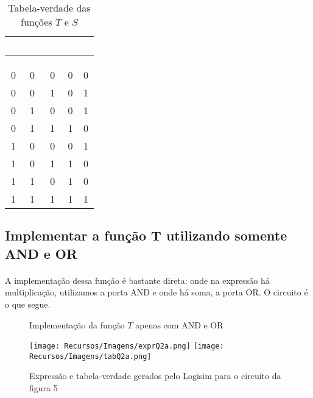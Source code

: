 \documentclass[a4paper, 12pt]{article}
\begin{document}
\begin{table}[H]
    \centering
    \begin{tabular}{|c|c|c|c|c|}
        \hline
        \rowcolor{black}
        \multicolumn{3}{|c|}{\textbf{\textcolor{white}{Entradas}}} & \multicolumn{2}{|c|}{\textbf{\textcolor{white}{Saídas}}} \\ \hline
        \rowcolor{black}
        \textcolor{white}{$A$} & \textcolor{white}{$B$} & \textcolor{white}{$C$} & \textcolor{white}{$T$} & \textcolor{white}{$S$} \\ \hline
        0 & 0 & 0 & 0 & 0 \\ \hline
        \rowcolor{lightgray}
        0 & 0 & 1 & 0 & 1 \\ \hline
        0 & 1 & 0 & 0 & 1 \\ \hline
        \rowcolor{lightgray}
        0 & 1 & 1 & 1 & 0 \\ \hline
        1 & 0 & 0 & 0 & 1 \\ \hline
        \rowcolor{lightgray}
        1 & 0 & 1 & 1 & 0 \\ \hline
        1 & 1 & 0 & 1 & 0 \\ \hline
        \rowcolor{lightgray}
        1 & 1 & 1 & 1 & 1 \\ \hline
    \end{tabular}
    \caption{Tabela-verdade das funções $T$ e $S$}
\end{table}

\subsection{Implementar a função T utilizando somente AND e OR}
\paragraph{}
A implementação dessa função é bastante direta: onde na expressão há multiplicação, utilizamos a porta AND e onde há soma, a porta OR. O circuito é o que segue.

\begin{figure}[H]
    \centering
    
    \vspace{-30pt}
    \caption{Implementação da função $T$ apenas com AND e OR}
\end{figure}

\begin{figure}[H]
    \centering
    \texttt{[image: Recursos/Imagens/exprQ2a.png]}
    \texttt{[image: Recursos/Imagens/tabQ2a.png]} \\
    \caption{Expressão e tabela-verdade gerados pelo Logisim para o circuito da figura 5}
\end{figure}
\end{document}
